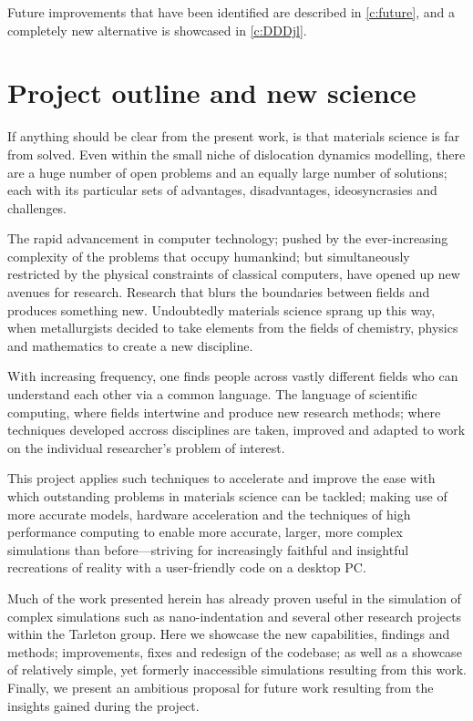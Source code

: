 Future improvements that have been identified are described in \cref{c:future}, and a completely new alternative is showcased in \cref{c:DDDjl}.

\section{Project outline and new science}
\label{s:objectives}

If anything should be clear from the present work, is that materials science is far from solved. Even within the small niche of dislocation dynamics modelling, there are a huge number of open problems and an equally large number of solutions; each with its particular sets of advantages, disadvantages, ideosyncrasies and challenges.

The rapid advancement in computer technology; pushed by the ever-increasing complexity of the problems that occupy humankind; but simultaneously restricted by the physical constraints of classical computers, have opened up new avenues for research. Research that blurs the boundaries between fields and produces something new. Undoubtedly materials science sprang up this way, when metallurgists decided to take elements from the fields of chemistry, physics and mathematics to create a new discipline.

With increasing frequency, one finds people across vastly different fields who can understand each other via a common language. The language of scientific computing, where fields intertwine and produce new research methods; where techniques developed accross disciplines are taken, improved and adapted to work on the individual researcher's problem of interest.

This project applies such techniques to accelerate and improve the ease with which outstanding problems in materials science can be tackled; making use of more accurate models, hardware acceleration and the techniques of high performance computing to enable more accurate, larger, more complex simulations than before---striving for increasingly faithful and insightful recreations of reality with a user-friendly code on a desktop PC.

Much of the work presented herein has already proven useful in the simulation of complex simulations such as nano-indentation \cite{YU2018} and several other research projects within the Tarleton group. Here we showcase the new capabilities, findings and methods; improvements, fixes and redesign of the codebase; as well as a showcase of relatively simple, yet formerly inaccessible simulations resulting from this work. Finally, we present an ambitious proposal for future work resulting from the insights gained during the project.
\savearabiccounter

